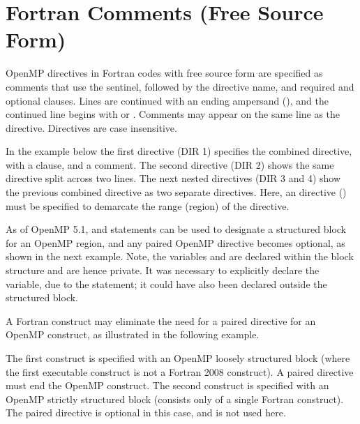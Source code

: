 \section{Fortran Comments (Free Source Form)}
\label{sec:fortran_free_format_comments}

OpenMP directives in Fortran codes with free source form are specified as comments
that use the  sentinel, followed by the
directive name, and required and optional clauses.  Lines are continued with an ending ampersand (\scode{&}),
and the continued line begins with  or . Comments may appear on the
same line as the directive.  Directives are case insensitive.

In the example below the first directive (DIR 1) specifies the %
 combined directive, with a  clause, and a comment.
The second directive (DIR 2) shows the same directive split across two lines. 
The next nested directives (DIR 3 and 4) show the previous combined directive as
two separate directives. 
Here, an  directive () must be specified to demarcate the range (region)
of the  directive. 

\clearpage

As of OpenMP 5.1,  and  statements can be used to designate 
a structured block for an OpenMP region, and any paired OpenMP  directive becomes optional,
as shown in the next example.  Note, the variables  and  are declared within the 
block structure and are hence private.
It was necessary to explicitly declare the  variable, due to the  statement; 
it could have also been declared outside the structured block.


A Fortran  construct may eliminate the need for a paired  directive for an OpenMP construct, 
as illustrated in the following example.

The first  construct is specified with an OpenMP loosely structured block 
(where the first executable construct is not a Fortran 2008  construct). 
A paired  directive must end the OpenMP construct.
The second  construct is specified with an OpenMP strictly structured block 
(consists only of a single Fortran  construct). 
The paired  directive is optional in this case, and is not used here.

